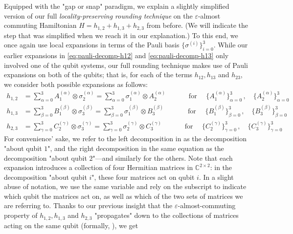 \documentclass[11pt]{article}
\theoremstyle{plain}
\newcommand{\eps}{\varepsilon}
\begin{document}
Equipped with the "gap or snap" paradigm, we explain a slightly simplified version of our full \emph{locality-preserving rounding technique} on the $\eps$-almost commuting Hamiltonian $H = h_{1,2} + h_{1,3} + h_{2,3}$ from before. (We will indicate the step that was simplified when we reach it in our explanation.) 
To this end, we once again use local expansions in terms of the Pauli basis $\{\sigma^{(i)}\}_{i=0}^3$. While our earlier expansions in \eqref{eq:pauli-decomp-h12} and \eqref{eq:pauli-decomp-h13} only involved one of the qubit systems, our full rounding technique makes use of Pauli expansions on both of the qubits; that is, for each of the terms $h_{12}, h_{13}$ and $h_{23}$, we consider both possible expansions as follows:
\begin{align}
h_{1,2} &= \sum_{\alpha=0}^3 A^{(\alpha)}_1 \otimes \sigma_2^{(\alpha)} = \sum_{\alpha=0}^3 \sigma^{(\alpha)}_1 \otimes A_2^{(\alpha)}  \quad\quad\quad \text { for } \quad \{A_1^{(\alpha)}\}_{\alpha=0}^3\, , \quad \{A_2^{(\alpha)}\}_{\alpha=0}^3\quad\label{eq:pauli-decomp-h12-full}\\
h_{1,3} &= \sum_{\beta=0}^3 B^{(\beta)}_1 \otimes \sigma_3^{(\beta)} = \sum_{\beta=0}^3 \sigma^{(\beta)}_1 \otimes B_3^{(\beta)}   \quad\quad\quad \,\text { for } \quad \{B_1^{(\beta)}\}_{\beta=0}^3\, , \quad \{B_3^{(\beta)}\}_{\beta=0}^3\quad\label{eq:pauli-decomp-h13-full} 
\\h_{2,3} &= \sum_{\gamma=0}^3 C^{(\gamma)}_2 \otimes \sigma_3^{(\gamma)} = \sum_{\gamma=0}^3 \sigma^{(\gamma)}_2 \otimes C_3^{(\gamma)}   \quad\quad\,
\,\,\,\,\,\text { for } \quad \{C_2^{(\gamma)}\}_{\gamma=0}^3\, , \quad \{C_3^{(\gamma)}\}_{\gamma=0}^3 \quad\label{eq:pauli-decomp-h23-full}
\end{align}
For convenience' sake, we refer to the left decomposition in  as the decomposition "about qubit $1$", and the right decomposition in the same equation as the decomposition "about qubit $2$"---and similarly for the others. Note that each expansion introduces a collection of four Hermitian matrices in $\mathbb{C}^{2 \times 2}$: in the decomposition "about qubit $i$", these four matrices act on qubit $i$. In a slight abuse of notation, we use the same variable and rely on the subscript to indicate which qubit the matrices act on, as well as which of the two sets of matrices we are referring to. Thanks to our previous insight that the $\eps$-almost-commuting property of $h_{1,2}, h_{1,3}$ and $h_{2,3}$ "propagates" down to the collections of matrices acting on the same qubit (formally, ), we get
\end{document}
